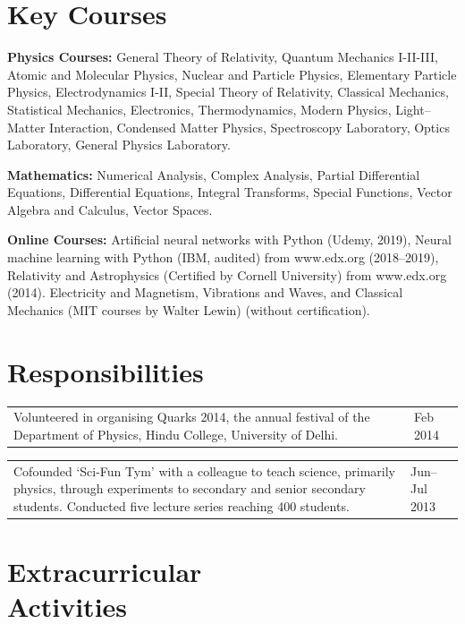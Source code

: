 \documentclass[margin,line]{res}
\begin{document}
\begin{resume}
\vspace{.2in}
\section{\sc Key Courses}
{\bf Physics Courses:} General Theory of Relativity, Quantum Mechanics I-II-III, Atomic and Molecular Physics, Nuclear and Particle Physics, Elementary Particle Physics, Electrodynamics I-II, Special Theory of Relativity, Classical Mechanics, Statistical Mechanics, Electronics, Thermodynamics, Modern Physics, Light--Matter Interaction, Condensed Matter Physics, Spectroscopy Laboratory, Optics Laboratory, General Physics Laboratory.

{ \bf Mathematics:}
Numerical Analysis, Complex Analysis, Partial Differential Equations, Differential Equations, Integral Transforms, Special Functions, Vector Algebra and Calculus, Vector Spaces.

{\bf Online Courses:} Artificial neural networks with Python (Udemy, 2019), Neural machine learning with Python (IBM, audited) from www.edx.org (2018--2019), Relativity and Astrophysics (Certified by Cornell University) from www.edx.org (2014). Electricity and Magnetism, Vibrations and Waves, and Classical Mechanics (MIT courses by Walter Lewin) (without certification).

\vspace{.2in}
\section{\sc Responsibilities}

\begin{tabular}{@{}p{\dimexpr\linewidth-0.62in-3\tabcolsep\relax}p{0.62in}}
{Volunteered in organising Quarks 2014, the annual festival of the Department of Physics, Hindu College, University of Delhi.} & \raggedright Feb 2014
\end{tabular}

\begin{tabular}{@{}p{\dimexpr\linewidth-0.62in-3\tabcolsep\relax}p{0.62in}}
{Cofounded ‘Sci-Fun Tym’ with a colleague to teach science, primarily physics, through experiments to secondary and senior secondary students. Conducted five lecture series reaching 400 students.} & \raggedright Jun--Jul 2013
\end{tabular}

\vspace{.2in}
\section{\sc Extracurricular \\ Activities}


\end{resume}
\end{document}
